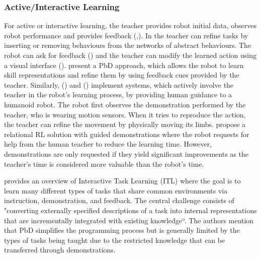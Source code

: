 \subsubsection{Active/Interactive Learning}\label{sssec:Active Learning} 
For active or interactive learning, the teacher provides robot initial data, observes robot performance and provides feedback (\cite{chernova2014robot},\cite{calinon2007active}).
In \cite{nicolescu2003natural} the teacher can refine tasks by inserting or removing behaviours from the networks of abstract behaviours.
The robot can ask for feedback (\cite{cakmak2012aaai}) and the teacher can modify the learned action using a visual interface (\cite{alexandrova2015roboflow}).
\cite{nicolescu2003natural} present a PbD approach, which allows the robot to learn skill representations and refine them by using feedback cues provided by the teacher.
Similarly, (\cite{calinon2007active}) and (\cite{calinon2007incremental}) implement systems, which actively involve the teacher in the robot's learning process, by providing human guidance to a humanoid robot. 
The robot first observes the demonstration performed by the teacher, who is wearing motion sensors. When it tries to reproduce the action, the teacher can refine the movement by physically moving its limbs.
\cite{martinez2017relational} propose a relational RL solution with guided demonstrations where the robot requests for help from the human teacher to reduce the learning time.
However, demonstrations are only requested if they yield significant improvements as the teacher's time is considered more valuable than the robot's time.

\cite{laird2017interactive} provides an overview of Interactive Task Learning (ITL) where the goal is to learn many different types of tasks that share common environments via instruction, demonstration, and feedback. 
The central challenge consists of "converting externally specified descriptions of a task into internal representations that are incrementally integrated with existing knowledge``.
The authors mention that PbD simplifies the programming process but is generally limited by the types of tasks being taught due to the restricted knowledge that can be transferred through demonstrations.



